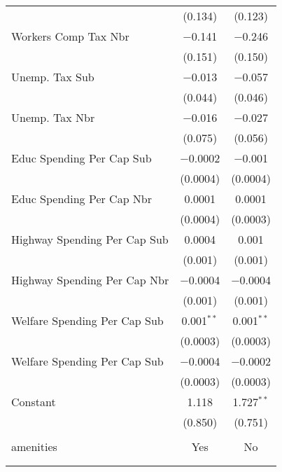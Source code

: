 \begin{table}[!htbp]
\begin{tabular}{@{\extracolsep{5pt}}lcc}
  & (0.134) & (0.123) \\ 
  Workers Comp Tax Nbr & $-$0.141 & $-$0.246 \\ 
  & (0.151) & (0.150) \\ 
  Unemp. Tax Sub & $-$0.013 & $-$0.057 \\ 
  & (0.044) & (0.046) \\ 
  Unemp. Tax Nbr & $-$0.016 & $-$0.027 \\ 
  & (0.075) & (0.056) \\ 
  Educ Spending Per Cap Sub & $-$0.0002 & $-$0.001 \\ 
  & (0.0004) & (0.0004) \\ 
  Educ Spending Per Cap Nbr & 0.0001 & 0.0001 \\ 
  & (0.0004) & (0.0003) \\ 
  Highway Spending Per Cap Sub & 0.0004 & 0.001 \\ 
  & (0.001) & (0.001) \\ 
  Highway Spending Per Cap Nbr & $-$0.0004 & $-$0.0004 \\ 
  & (0.001) & (0.001) \\ 
  Welfare Spending Per Cap Sub & 0.001$^{**}$ & 0.001$^{**}$ \\ 
  & (0.0003) & (0.0003) \\ 
  Welfare Spending Per Cap Sub & $-$0.0004 & $-$0.0002 \\ 
  & (0.0003) & (0.0003) \\ 
  Constant & 1.118 & 1.727$^{**}$ \\ 
  & (0.850) & (0.751) \\ 
 \hline \\[-1.8ex] 
amenities & Yes & No \\ 
\hline \\[-1.8ex] 
\hline 
\hline \\[-1.8ex] 
\end{tabular} 
\end{table} 
